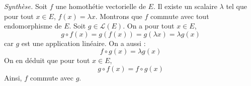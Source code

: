 \documentclass[a4paper,twoside,french,11pt]{VcCours}
\begin{document}
\begin{enumerate}
\noindent \textit{Synthèse.} Soit $f$ une homothétie vectorielle de $E$. Il existe un scalaire $\lambda$ tel que pour tout $x \in E$, $f(x)= \lambda x$. Montrons que $f$ commute avec tout endomorphisme de $E$. Soit $g \in \mathcal{L}(E)$. On a pour tout $x \in E$,
$$ g \circ f(x) = g (f(x)) = g(\lambda x)= \lambda g(x)$$
car $g$ est une application linéaire. On a aussi :
$$ f \circ g(x) = \lambda g(x)$$
On en déduit que pour tout $x \in E$,
$$ g \circ f(x) = f \circ g(x)$$
Ainsi, $f$ commute avec $g$.
\end{enumerate}








%
%
%
%
%
%
%
%
%
%

%    
%
%

%
%
%
\end{document}
